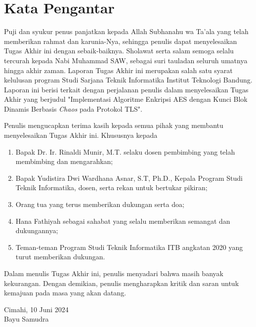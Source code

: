 \chapter*{Kata Pengantar}

Puji dan syukur penus panjatkan kepada Allah Subhanahu wa Ta'ala yang telah memberikan rahmat dan karunia-Nya, sehingga penulis dapat menyelesaikan Tugas Akhir ini dengan sebaik-baiknya. Sholawat serta salam semoga selalu tercurah kepada Nabi Muhammad SAW, sebagai suri tauladan seluruh umatnya hingga akhir zaman. Laporan Tugas Akhir ini merupakan salah satu syarat kelulusan program Studi Sarjana Teknik Informatika Institut Teknologi Bandung. Laporan ini berisi terkait dengan perjalanan penulis dalam menyelesaikan Tugas Akhir yang berjudul "Implementasi Algoritme Enkripsi AES dengan Kunci Blok Dinamis Berbasis \emph{Chaos} pada Protokol TLS".

Penulis mengucapkan terima kasih kepada semua pihak yang membantu menyelesaikan Tugas Akhir ini. Khususnya kepada
\begin{enumerate}
  \item Bapak Dr. Ir. Rinaldi Munir, M.T. selaku dosen pembimbing yang telah membimbing dan mengarahkan;
  \item Bapak Yudistira Dwi Wardhana Asnar, S.T, Ph.D., Kepala Program Studi Teknik Informatika, dosen, serta rekan untuk bertukar pikiran;
  \item Orang tua yang terus memberikan dukungan serta doa;
  \item Hana Fathiyah sebagai sahabat yang selalu memberikan semangat dan dukungannya;
  \item Teman-teman Program Studi Teknik Informatika ITB angkatan 2020 yang turut memberikan dukungan.
\end{enumerate}

Dalam menulis Tugas Akhir ini, penulis menyadari bahwa masih banyak kekurangan. Dengan demikian, penulis mengharapkan kritik dan saran untuk kemajuan pada masa yang akan datang.

\begin{flushright}
  Cimahi, 10 Juni 2024 \\


  Bayu Samudra
\end{flushright}